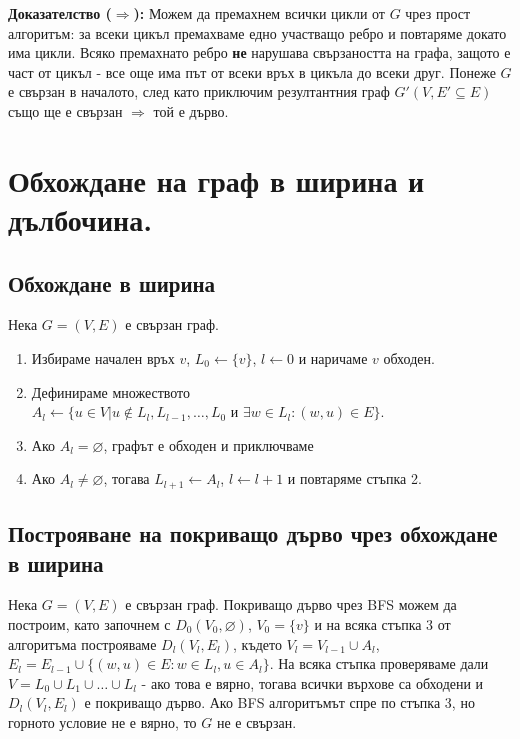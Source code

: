 \documentclass[fleqn,12pt]{article}
\begin{document}
\textbf{Доказателство ($\Rightarrow$):} Можем да премахнем всички цикли от $G$ чрез прост алгоритъм: за всеки цикъл премахваме едно участващо ребро
и повтаряме докато има цикли. Всяко премахнато ребро \textbf{не} нарушава свързаността на графа, защото е част от цикъл - все още има 
път от всеки връх в цикъла до всеки друг.
Понеже $G$ е свързан в началото, след като приключим резултантния граф $G'(V, E' \subseteq E)$ също ще е свързан $\Rightarrow$ той е дърво.

\section{Обхождане на граф в ширина и дълбочина.}

\subsection{Обхождане в ширина} 
Нека $G = (V, E)$ е свързан граф. 
\begin{enumerate}
	\item Избираме начален връх $v$, $L_0 \leftarrow \{ v \}$, $l \leftarrow 0$ и наричаме $v$ обходен.
	\item Дефинираме множеството $A_l \leftarrow \{ u \in V | u \notin L_l, L_{l-1}, \dots, L_0 \text{ и } \exists w \in L_l : (w, u) \in E \}$.
	\item Ако $A_l = \varnothing$, графът е обходен и приключваме
	\item Ако $A_l \neq \varnothing$, тогава $L_{l+1} \leftarrow A_l$, $ l \leftarrow l + 1$ и повтаряме стъпка 2.
\end{enumerate}

\subsection{Построяване на покриващо дърво чрез обхождане в ширина} 
Нека $G = (V, E)$ е свързан граф.
Покриващо дърво чрез BFS можем да построим, като започнем с $D_0(V_0, \varnothing)$, $V_0 = \{ v \}$ и на всяка стъпка 3 
от алгоритъма построяваме $D_l(V_l, E_l)$, където $V_l = V_{l - 1} \cup A_l$, 
$E_l = E_{l - 1} \cup \{ (w, u) \in E : w \in L_l, u \in A_l \}$. На всяка стъпка проверяваме дали 
$V = L_0 \cup L_1 \cup \dots \cup L_l$ - ако това е вярно, тогава всички върхове са обходени и $D_l(V_l, E_l)$ е покриващо дърво.
Ако BFS алгоритъмът спре по стъпка 3, но горното условие не е вярно, то $G$ не е свързан.
\vspace{10mm}
\end{document}
